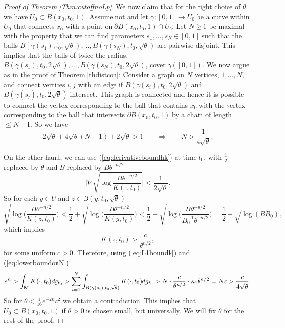 \documentclass[11pt]{amsart}
\numberwithin{equation}{section}
\def\M{{\bf M}}
\numberwithin{equation}{section}
\begin{document}
\begin{proof}[Proof of Theorem \ref{Thm:cutoffnoLp}]
We now claim that for the right choice of $\theta$ we have $U_0 \subset B(x_0, t_0, 1)$.
Assume not and let $\gamma : [0,1] \to U_0$ be a curve within $U_0$ that connects $x_0$ with a point on $\partial B(x_0, t_0, 1) \cap U_0$.
Let $N \geq 1$ be maximal with the property that we can find parameters $s_1, \ldots, s_N \in [0,1]$ such that the balls $B(\gamma(s_1), t_0, \sqrt{\theta}), \ldots, B(\gamma(s_N), t_0, \sqrt{\theta})$ are pairwise disjoint.
This implies that the balls of twice the radius, $B(\gamma(s_1), t_0, 2\sqrt{\theta}), \ldots, B(\gamma(s_N), t_0, 2\sqrt{\theta})$, cover $\gamma([0,1])$.
We now argue as in the proof of Theorem \ref{thdistcon}:
Consider a graph on $N$ vertices, $1, \ldots, N$, and connect vertices $i,j$ with an edge if $B(\gamma(s_i), t_0, 2 \sqrt{\theta})$ and $B(\gamma(s_j), t_0, 2 \sqrt{\theta})$ intersect.
This graph is connected and hence it is possible to connect the vertex corresponding to the ball that contains $x_0$ with the vertex corresponding to the ball that intersects $\partial B(x_0, t_0, 1)$ by a chain of length $\leq N-1$.
So we have
\begin{equation} \label{eq:lowerboundonN}
  2 \sqrt{\theta} + 4 \sqrt{\theta} (N-1) + 2 \sqrt{\theta} > 1 \qquad \Longrightarrow \qquad N > \frac{1}{4 \sqrt{\theta}}.
\end{equation}

On the other hand, we can use (\ref{eq:derivativeboundhk}) at time $t_0$, with $\frac12$ replaced by $\theta$ and $B$ replaced by $B \theta^{-n/2}$
\[  \Bigg| \nabla \sqrt{ \log  \frac{B \theta^{-n/2}}{K(\cdot, t_0)}  } \Bigg| < \frac{1}{2\sqrt{\theta}}. \]
So for each $y \in U$ and $z \in B(y, t_0, \sqrt{\theta})$
\[ \sqrt{ \log \bigg( \frac{B \theta^{-n/2}}{K(z, t_0)} \bigg) }  <  \frac12 + \sqrt{\log \bigg( \frac{B \theta^{-n/2}}{K(y, t_0)} \Big) } < \frac12 + \sqrt{\log \bigg( \frac{B \theta^{-n/2}}{B_0^{-1} \theta^{-n/2}} \Big) } = \frac12 + \sqrt{\log (B B_0) }, \]
which implies
\[ K(z,t_0)  > \frac{c}{\theta^{n/2}}, \]
for some uniform $c > 0$.
Therefore, using (\ref{eq:L1boundk}) and (\ref{eq:lowerboundonN})
\[ e^n > \int_{\M} K(\cdot, t_0) dg_{t_0} > \sum_{i =1}^N \int_{B(\gamma(s_i), t_0, \sqrt{\theta})} K(\cdot, t_0) dg_{t_0} > N \cdot \frac{c}{\theta^{n/2}} \cdot \kappa_1 \theta^{n/2} = N c  > \frac{c }{4 \sqrt{\theta}}. \]
So for $\theta < \frac1{16} e^{-2n} c^2$ we obtain a contradiction.
This implies that $U_0 \subset B(x_0, t_0, 1)$ if $\theta > 0$ is chosen small, but universally.
We will fix $\theta$ for the rest of the proof.


\end{proof}
\end{document}
